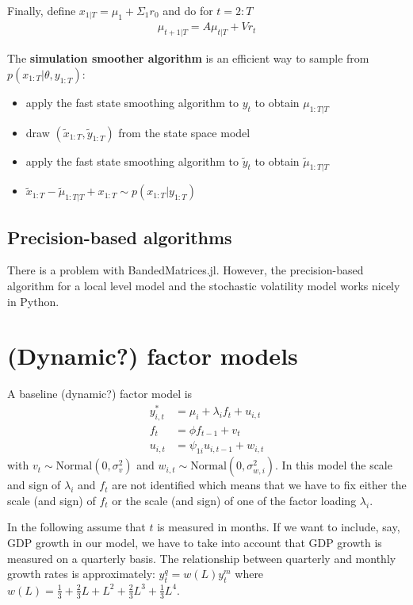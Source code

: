 \documentclass[12pt,a4paper]{scrartcl}
\begin{document}
Finally, define $x_{1|T}=\mu_1 + \Sigma_1 r_0$ and do for $t=2:T$
\begin{align*}
\mu_{t+1|T} = A \mu_{t|T} + V r_t
\end{align*}

The \textbf{simulation smoother algorithm} \citep{bibid} is an efficient way to sample from $p(x_{1:T}|\theta, y_{1:T})$:
\begin{itemize}
	\item apply the fast state smoothing algorithm to $y_t$ to obtain $\mu_{1:T|T}$
	\item draw $(\tilde{x}_{1:T}, \tilde{y}_{1:T})$ from the state space model
	\item apply the fast state smoothing algorithm to $\tilde{y}_t$ to obtain $\tilde{\mu}_{1:T|T}$
	\item $\tilde{x}_{1:T} - \tilde{\mu}_{1:T|T} + x_{1:T} \sim p(x_{1:T}|y_{1:T})$
\end{itemize}

\subsection{Precision-based algorithms}

There is a problem with \textsf{BandedMatrices.jl}. However, the precision-based algorithm for a local level model and the stochastic volatility model works nicely in Python.

\section{(Dynamic?) factor models}

A baseline (dynamic?) factor model is
\begin{align*}
y^*_{i,t} &= \mu_i + \lambda_i f_{t} + u_{i,t}     \\
f_t &= \phi f_{t-1} + v_t                   \\
u_{i,t} &= \psi_{1i} u_{i,t-1} + w_{i,t}
\end{align*}
with $v_t \sim \mathrm{Normal}(0,\sigma^2_v)$ and $w_{i,t} \sim \mathrm{Normal}(0,\sigma^2_{w,i})$. In this model the scale and sign of $\lambda_i$ and $f_t$ are not identified which means that we have to fix either the scale (and sign) of $f_t$ or the scale (and sign) of one of the factor loading $\lambda_i$.

In the following assume that $t$ is measured in months. If we want to include, say, GDP growth in our model, we have to take into account that GDP growth is measured on a quarterly basis. The relationship between quarterly and monthly growth rates is approximately: $y^q_t = w(L) y^m_t$ where $w(L) = \frac{1}{3} + \frac{2}{3} L + L^2 + \frac{2}{3} L^3 + \frac{1}{3} L^4$.
\end{document}
